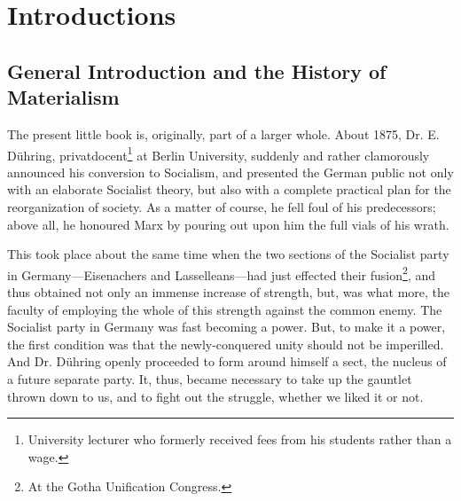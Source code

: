 \chapter{Introductions}

\section*{General Introduction and the History of Materialism}

The present little book is, originally, part of a larger whole. About 1875,
Dr. E. Dühring, privatdocent\footnote{University lecturer who formerly received
fees from his students rather than a wage.} at Berlin University, suddenly and
rather clamorously announced his conversion to Socialism, and presented the
German public not only with an elaborate Socialist theory, but also with a
complete practical plan for the reorganization of society. As a matter of
course, he fell foul of his predecessors; above all, he honoured Marx by pouring
out upon him the full vials of his wrath.

This took place about the same time when the two sections of the Socialist
party in Germany---Eisenachers and Lasselleans---had just effected their
fusion\footnote{At the Gotha Unification Congress.}, and thus obtained not only
an immense increase of strength, but, was what more, the faculty of employing
the whole of this strength against the common enemy. The Socialist party in
Germany was fast becoming a power. But, to make it a power, the first condition
was that the newly-conquered unity should not be imperilled. And Dr. Dühring
openly proceeded to form around himself a sect, the nucleus of a future
separate party. It, thus, became necessary to take up the gauntlet thrown
down to us, and to fight out the struggle, whether we liked it or not.

